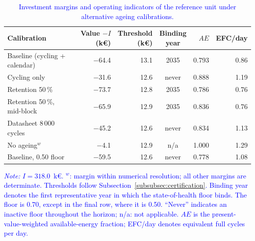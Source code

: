\documentclass[preprint,12pt]{elsarticle}
\begin{document}
\begin{table}[htbp!]
    \centering
    \caption{\textcolor{blue}{Investment margins and operating indicators
    of the reference unit under alternative ageing calibrations.}}
    \label{tab:res_ageing}
    \footnotesize
    \setlength{\tabcolsep}{3pt}
    \begin{tabular}{l r r c r r}
        \toprule
        Calibration
        & \shortstack{Value $- I$\\(k\euro{})}
        & \shortstack{Threshold\\(k\euro{})}
        & \shortstack{Binding\\year}
        & $AE$
        & EFC/day \\
        \midrule
        Baseline (cycling + calendar)
            & $-$64.4 & 13.1 & 2035 & 0.793 & 0.86 \\
        Cycling only
            & $-$31.6 & 12.6 & never & 0.888 & 1.19 \\
        Retention 50\,\%
            & $-$73.7 & 12.8 & 2035 & 0.786 & 0.76 \\
        Retention 50\,\%, mid-block
            & $-$65.9 & 12.9 & 2035 & 0.836 & 0.76 \\
        Datasheet 8\,000 cycles
            & $-$45.2 & 12.6 & never & 0.834 & 1.13 \\
        No ageing$^{w}$
            & $-$4.1 & 12.9 & n/a & 1.000 & 1.29 \\
        \midrule
        Baseline, 0.50 floor
            & $-$59.5 & 12.6 & never & 0.778 & 1.08 \\
        \bottomrule
    \end{tabular}
    \par\smallskip
    \begin{minipage}{\linewidth}
        \footnotesize\raggedright
        \textcolor{blue}{\textit{Note:} $I=318.0$~k\euro{}. $^{w}$: margin within numerical resolution; all other margins are determinate.
        Thresholds follow Subsection~\ref{subsubsec:certification}. Binding year denotes the first representative year in which the state-of-health floor binds. The floor is 0.70, except in the final row, where it is 0.50. 
        ``Never'' indicates an inactive floor throughout the horizon; n/a: not applicable.
        $AE$ is the present-value-weighted available-energy fraction; EFC/day denotes equivalent full cycles per day.}
    \end{minipage}
\end{table}
\end{document}
